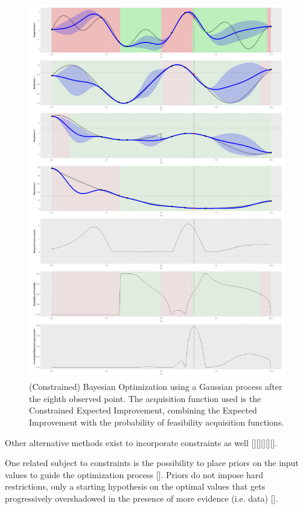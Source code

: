 \begin{figure}[h]
	\centering
	\includegraphics[width=\textwidth]{figures/bo_gp_regression_constraints}
	\decoRule
	\caption[Constrained Bayesian Optimization]{(Constrained) Bayesian Optimization using a Gaussian process after the eighth observed point. The acquisition function used is the Constrained Expected Improvement, combining the Expected Improvement with the probability of feasibility acquisition functions.}
	\label{fig:bo_gp_regression_constraints}
\end{figure}

Other alternative methods exist to incorporate constraints as well [\cite{paulson_cobalt_2021}][\cite{ungredda_bayesian_2021}][\cite{hernandez-lobato_general_2016}][\cite{swiler_survey_2020}][\cite{lam_lookahead_nodate}].

One related subject to constraints is the possibility to place priors on the input values to guide the optimization process [\cite{souza_bayesian_2021}]. Priors do not impose hard restrictions, only a starting hypothesis on the optimal values that gets progressively overshadowed in the presence of more evidence (i.e. data) [\cite{stark_constraints_2015}].

